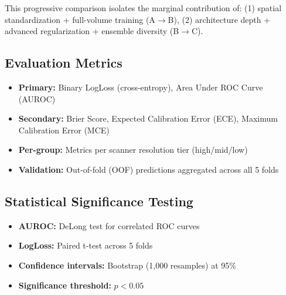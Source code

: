 This progressive comparison isolates the marginal contribution of: (1) spatial standardization + full-volume training (A$\to$B), (2) architecture depth + advanced regularization + ensemble diversity (B$\to$C).

\subsection{Evaluation Metrics}
\label{sec:metrics}

\begin{itemize}
    \item \textbf{Primary:} Binary LogLoss (cross-entropy), Area Under ROC Curve (AUROC)
    \item \textbf{Secondary:} Brier Score, Expected Calibration Error (ECE), Maximum Calibration Error (MCE)
    \item \textbf{Per-group:} Metrics per scanner resolution tier (high/mid/low)
    \item \textbf{Validation:} Out-of-fold (OOF) predictions aggregated across all 5 folds
\end{itemize}

\subsection{Statistical Significance Testing}
\label{sec:statistical}

\begin{itemize}
    \item \textbf{AUROC:} DeLong test for correlated ROC curves
    \item \textbf{LogLoss:} Paired t-test across 5 folds
    \item \textbf{Confidence intervals:} Bootstrap (1,000 resamples) at 95\%
    \item \textbf{Significance threshold:} $p < 0.05$
\end{itemize}